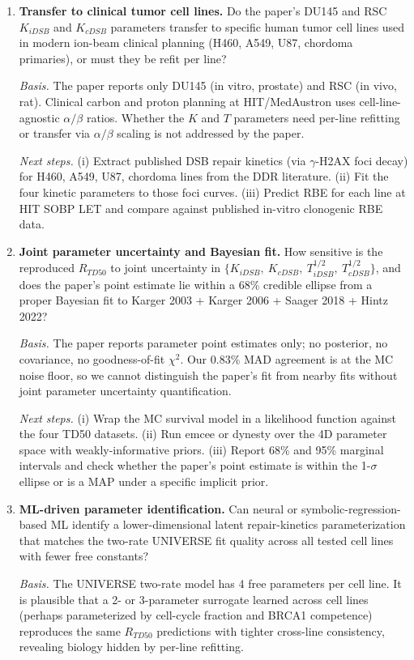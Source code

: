 \begin{enumerate}
\item \textbf{Transfer to clinical tumor cell lines.}
Do the paper's DU145 and RSC $K_{iDSB}$ and $K_{cDSB}$ parameters transfer
to specific human tumor cell lines used in modern ion-beam clinical
planning (H460, A549, U87, chordoma primaries), or must they be refit per
line?

\emph{Basis.} The paper reports only DU145 (in vitro, prostate) and RSC
(in vivo, rat). Clinical carbon and proton planning at HIT/MedAustron uses
cell-line-agnostic $\alpha/\beta$ ratios. Whether the $K$ and $T$
parameters need per-line refitting or transfer via $\alpha/\beta$ scaling is
not addressed by the paper.

\emph{Next steps.} (i) Extract published DSB repair kinetics (via
$\gamma$-H2AX foci decay) for H460, A549, U87, chordoma lines from the DDR
literature. (ii) Fit the four kinetic parameters to those foci curves.
(iii) Predict RBE for each line at HIT SOBP LET and compare against
published in-vitro clonogenic RBE data.

\item \textbf{Joint parameter uncertainty and Bayesian fit.}
How sensitive is the reproduced $R_{TD50}$ to joint uncertainty in
$\{K_{iDSB},\ K_{cDSB},\ T_{iDSB}^{1/2},\ T_{cDSB}^{1/2}\}$, and does the
paper's point estimate lie within a 68\% credible ellipse from a proper
Bayesian fit to Karger 2003 + Karger 2006 + Saager 2018 + Hintz 2022?

\emph{Basis.} The paper reports parameter point estimates only; no
posterior, no covariance, no goodness-of-fit $\chi^{2}$. Our 0.83\% MAD
agreement is at the MC noise floor, so we cannot distinguish the paper's
fit from nearby fits without joint parameter uncertainty quantification.

\emph{Next steps.} (i) Wrap the MC survival model in a likelihood function
against the four TD50 datasets. (ii) Run emcee or dynesty over the 4D
parameter space with weakly-informative priors. (iii) Report 68\% and 95\%
marginal intervals and check whether the paper's point estimate is within
the 1-$\sigma$ ellipse or is a MAP under a specific implicit prior.

\item \textbf{ML-driven parameter identification.}
Can neural or symbolic-regression-based ML identify a lower-dimensional
latent repair-kinetics parameterization that matches the two-rate UNIVERSE
fit quality across all tested cell lines with fewer free constants?

\emph{Basis.} The UNIVERSE two-rate model has 4 free parameters per cell
line. It is plausible that a 2- or 3-parameter surrogate learned across
cell lines (perhaps parameterized by cell-cycle fraction and BRCA1
competence) reproduces the same $R_{TD50}$ predictions with tighter
cross-line consistency, revealing biology hidden by per-line refitting.


\end{enumerate}
